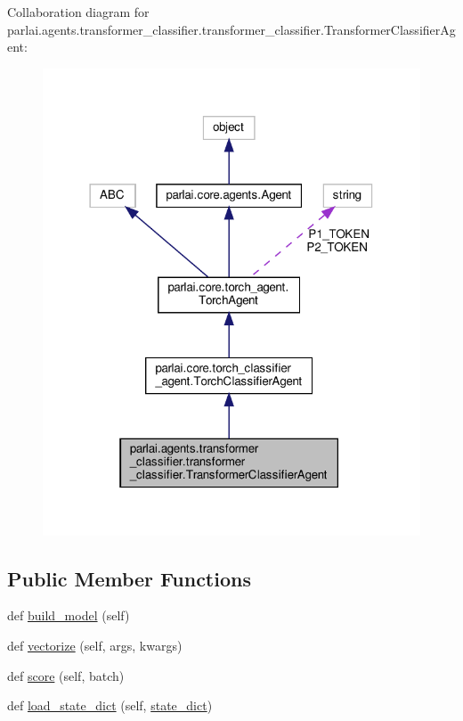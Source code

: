 Collaboration diagram for parlai.\+agents.\+transformer\+\_\+classifier.\+transformer\+\_\+classifier.\+Transformer\+Classifier\+Agent\+:
\nopagebreak
\begin{figure}[H]
\begin{center}
\leavevmode
\includegraphics[width=318pt]{classparlai_1_1agents_1_1transformer__classifier_1_1transformer__classifier_1_1TransformerClassifierAgent__coll__graph}
\end{center}
\end{figure}
\subsection*{Public Member Functions}
\begin{DoxyCompactItemize}
\item 
def \hyperlink{classparlai_1_1agents_1_1transformer__classifier_1_1transformer__classifier_1_1TransformerClassifierAgent_a10a0e65863e4e7b6a0ac30d3ff6f3c5f}{build\+\_\+model} (self)
\item 
def \hyperlink{classparlai_1_1agents_1_1transformer__classifier_1_1transformer__classifier_1_1TransformerClassifierAgent_afff32a6e789532e0bf6223b466e43588}{vectorize} (self, args, kwargs)
\item 
def \hyperlink{classparlai_1_1agents_1_1transformer__classifier_1_1transformer__classifier_1_1TransformerClassifierAgent_a8d3cb4862ab598c8f93239255dd65eeb}{score} (self, batch)
\item 
def \hyperlink{classparlai_1_1agents_1_1transformer__classifier_1_1transformer__classifier_1_1TransformerClassifierAgent_a2799356b935d49c3fa522f07428ff1c3}{load\+\_\+state\+\_\+dict} (self, \hyperlink{classparlai_1_1core_1_1torch__agent_1_1TorchAgent_a9f89e606931a4622a5c6a6f6b832235c}{state\+\_\+dict})
\end{DoxyCompactItemize}
